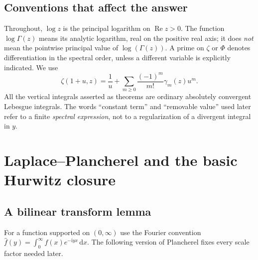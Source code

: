 \documentclass[11pt,a4paper]{article}
\theoremstyle{definition}
\numberwithin{equation}{section}
\newcommand{\Rea}{\operatorname{Re}}
\newcommand{\dd}{\,\mathrm d}
\newcommand{\ii}{\mathrm i}
\begin{document}
\subsection{Conventions that affect the answer}
Throughout, $\log z$ is the principal logarithm on $\Rea z>0$.
The function $\log\Gamma(z)$ means its analytic logarithm, real on the
positive real axis; it does \emph{not} mean the pointwise principal value
of $\log(\Gamma(z))$. A prime on $\zeta$ or $\Phi$ denotes differentiation
in the spectral order, unless a different variable is explicitly indicated.
We use
\begin{equation}\label{eq:laurent-convention}
 \zeta(1+u,z)=\frac1u+
      \sum_{m\ge0}\frac{(-1)^m}{m!}\gamma_m(z)u^m.
\end{equation}
All the vertical integrals asserted as theorems are ordinary absolutely
convergent Lebesgue integrals. The words ``constant term'' and ``removable
value'' used later refer to a finite \emph{spectral expression}, not to a
regularization of a divergent integral in $y$.

\section{Laplace--Plancherel and the basic Hurwitz closure}
\label{sec:laplace}

\subsection{A bilinear transform lemma}
For a function supported on $(0,\infty)$ use the Fourier convention
$\widehat f(y)=\int_0^\infty f(x)e^{-\ii yx}\dd x$.
The following version of Plancherel fixes every scale factor needed later.
\end{document}
